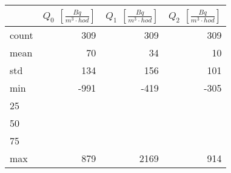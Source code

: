 \begin{tabular}{lrrr}
\toprule
{} &  $Q_0$ $\left[\si{\frac{Bq}{m^3\cdot hod}}\right]$ &  $Q_1$ $\left[\si{\frac{Bq}{m^3\cdot hod}}\right]$ &  $Q_2$ $\left[\si{\frac{Bq}{m^3\cdot hod}}\right]$ \\
\midrule
count &                                                309 &                                                309 &                                                309 \\
mean  &                                                 70 &                                                 34 &                                                 10 \\
std   &                                                134 &                                                156 &                                                101 \\
min   &                                               -991 &                                               -419 &                                               -305 \\
25\\%
50\\%
75\\%
max   &                                                879 &                                               2169 &                                                914 \\
\bottomrule
\end{tabular}
